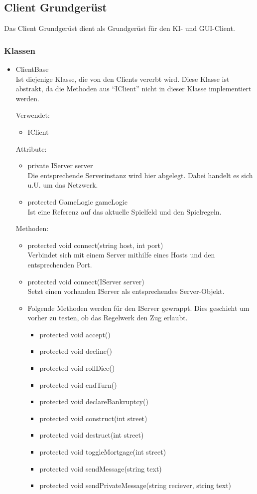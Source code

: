 \documentclass[a4paper,10pt]{article}
\begin{document}
\subsection{Client Grundgerüst}
Das Client Grundgerüst dient als Grundgerüst für den KI- und GUI-Client.
\subsubsection{Klassen}
\begin{itemize}
\item ClientBase\\
Ist diejenige Klasse, die von den Clients vererbt wird. Diese Klasse ist abstrakt, da die Methoden aus "`IClient"' nicht in dieser Klasse implementiert werden.

Verwendet:
\begin{itemize}
\item IClient
\end{itemize}
Attribute:
\begin{itemize}
\item private IServer server \\
Die entsprechende Serverinstanz wird hier abgelegt. Dabei handelt es sich u.U. um das Netzwerk.
\item protected GameLogic gameLogic \\
Ist eine Referenz auf das aktuelle Spielfeld und den Spielregeln.
\end{itemize}
Methoden:

\begin{itemize}
\item protected void connect(string host, int port) \\
Verbindet sich mit einem Server mithilfe eines Hosts und den entsprechenden Port.
\item protected void connect(IServer server) \\
Setzt einen vorhanden IServer als entsprechendes Server-Objekt.
\item Folgende Methoden werden für den IServer gewrappt. Dies geschieht um vorher zu testen, ob das Regelwerk den Zug erlaubt.
\begin{itemize}
\item protected void accept()
\item protected void decline()
\item protected void rollDice()
\item protected void endTurn()
\item protected void declareBankruptcy()
\item protected void construct(int street)
\item protected void destruct(int street)
\item protected void toggleMortgage(int street)
\item protected void sendMessage(string text)
\item protected void sendPrivateMessage(string reciever, string text)
\end{itemize}
\end{itemize} %
\end{itemize} %
\end{document}
